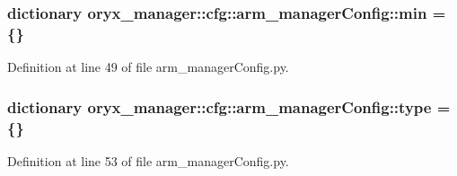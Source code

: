 \subsubsection[{min}]{\setlength{\rightskip}{0pt plus 5cm}dictionary {\bf oryx\-\_\-manager\-::cfg\-::arm\-\_\-manager\-Config\-::min} = \{\}}\label{namespaceoryx__manager_1_1cfg_1_1arm__managerConfig_ac51092d5e6498ad461e7fca37a6b5c4c}


\-Definition at line 49 of file arm\-\_\-manager\-Config.\-py.

\subsubsection[{type}]{\setlength{\rightskip}{0pt plus 5cm}dictionary {\bf oryx\-\_\-manager\-::cfg\-::arm\-\_\-manager\-Config\-::type} = \{\}}\label{namespaceoryx__manager_1_1cfg_1_1arm__managerConfig_a198d3871744fa529b951f452f67e8558}


\-Definition at line 53 of file arm\-\_\-manager\-Config.\-py.

